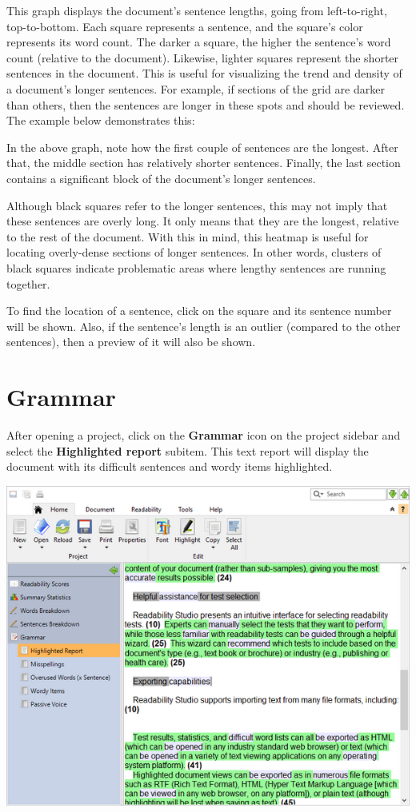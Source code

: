 \documentclass[
]{book}
\theoremstyle{definition}
\theoremstyle{definition}
\theoremstyle{definition}
\theoremstyle{definition}
\theoremstyle{remark}
\begin{document}
This graph displays the document's sentence lengths, going from left-to-right, top-to-bottom. Each square represents a sentence, and the square's color represents its word count. The darker a square, the higher the sentence's word count (relative to the document). Likewise, lighter squares represent the shorter sentences in the document. This is useful for visualizing the trend and density of a document's longer sentences. For example, if sections of the grid are darker than others, then the sentences are longer in these spots and should be reviewed. The example below demonstrates this:

In the above graph, note how the first couple of sentences are the longest. After that, the middle section has relatively shorter sentences. Finally, the last section contains a significant block of the document's longer sentences.

Although black squares refer to the longer sentences, this may not imply that these sentences are overly long. It only means that they are the longest, relative to the rest of the document. With this in mind, this heatmap is useful for locating overly-dense sections of longer sentences. In other words, clusters of black squares indicate problematic areas where lengthy sentences are running together.

To find the location of a sentence, click on the square and its sentence number will be shown. Also, if the sentence's length is an outlier (compared to the other sentences), then a preview of it will also be shown.

\hypertarget{reviewing-standard-grammar}{%
\section{Grammar}\label{reviewing-standard-grammar}}

After opening a project, click on the \textbf{Grammar} icon on the project sidebar and select the \textbf{Highlighted report} subitem. This text report will display the document with its difficult sentences and wordy items highlighted.

\includegraphics{Images/featuressentences.png}
\end{document}
